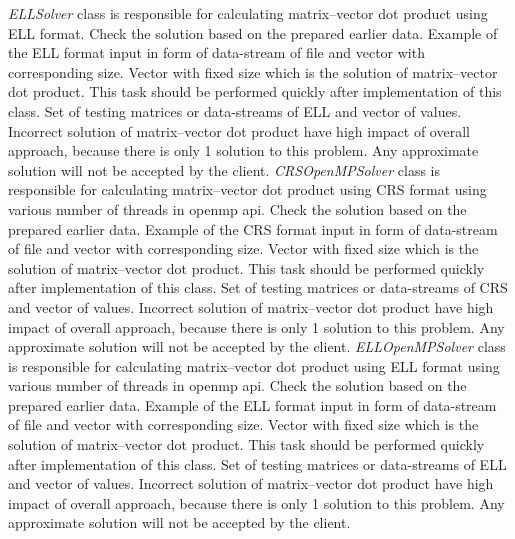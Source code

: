 	{
		{
			\emph{ELLSolver} class is responsible for calculating matrix--vector dot product using \gls{ELL} format.
		}
		{
			Check the solution based on the prepared earlier data.
		}
		{
			Example of the \gls{ELL} format input in form of data-stream of file and vector with corresponding size.
		}
		{
			Vector with fixed size which is the solution of matrix--vector dot product.
		}
		{
			This task should be performed quickly after implementation of this class.
		}
		{
			Set of testing matrices or data-streams of \gls{ELL} and vector of values.
		}
		{
			Incorrect solution of matrix--vector dot product have high impact of overall approach, because there is only 1 solution to this problem. Any approximate solution will not be accepted by the client.
		}
	}
	\clearpage
	{
		{
			\emph{CRSOpenMPSolver} class is responsible for calculating matrix--vector dot product using \gls{CRS} format using various number of threads in \gls{openmp} api.
		}
		{
			Check the solution based on the prepared earlier data.
		}
		{
			Example of the \gls{CRS} format input in form of data-stream of file and vector with corresponding size.
		}
		{
			Vector with fixed size which is the solution of matrix--vector dot product.
		}
		{
			This task should be performed quickly after implementation of this class.
		}
		{
			Set of testing matrices or data-streams of \gls{CRS} and vector of values.
		}
		{
			Incorrect solution of matrix--vector dot product have high impact of overall approach, because there is only 1 solution to this problem. Any approximate solution will not be accepted by the client.
		}
	}
	{
		{
			\emph{ELLOpenMPSolver} class is responsible for calculating matrix--vector dot product using \gls{ELL} format using various number of threads in \gls{openmp} api.
		}
		{
			Check the solution based on the prepared earlier data.
		}
		{
			Example of the \gls{ELL} format input in form of data-stream of file and vector with corresponding size.
		}
		{
			Vector with fixed size which is the solution of matrix--vector dot product.
		}
		{
			This task should be performed quickly after implementation of this class.
		}
		{
			Set of testing matrices or data-streams of \gls{ELL} and vector of values.
		}
		{
			Incorrect solution of matrix--vector dot product have high impact of overall approach, because there is only 1 solution to this problem. Any approximate solution will not be accepted by the client.
		}
	}
